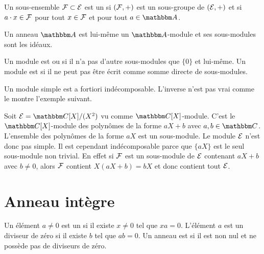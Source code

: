 Un sous-ensemble \( \mathcal{F}\subset\mathcal{E}\) est un  si \( (\mathcal{F},+)\) est un sous-groupe de \( (\mathcal{E},+)\) et si \( a\cdot x\in \mathcal{F}\) pour tout \( x\in \mathcal{F}\) et pour tout \( a\in \eA\).

\begin{example}
    Un anneau \( \eA\) est lui-même un \( \eA\)-module et ses sous-modules sont les idéaux.
\end{example}

Un module est  ou  si il n'a pas d'autre sous-modules que \( \{ 0 \}\) et lui-même. Un module est  si il ne peut pas être écrit comme somme directe de sous-modules.

Un module simple est a fortiori indécomposable. L'inverse n'est pas vrai comme le montre l'exemple suivant.

\begin{example}
    Soit \( \modE=\eC[X]/(X^2)\) vu comme \( \eC[X]\)-module. C'est le \( \eC[X]\)-module des polynômes de la forme \( aX+b\) avec \( a,b\in \eC\). L'ensemble des polynômes de la forme \( aX\) est un sous-module. Le module \( \mathcal{E}\) n'est donc pas simple. Il est cependant indécomposable parce que \( \{ aX \}\) est le seul sous-module non trivial. En effet si \( \mathcal{F}\) est un sous-module de \( \mathcal{E}\) contenant \( aX+b\) avec \( b\neq 0\), alors \( \mathcal{F}\) contient \( X(aX+b)=bX\) et donc contient tout \( \mathcal{E}\).
\end{example}

\section{Anneau intègre}

Un élément \( a\neq 0\) est un  si il existe \( x\neq 0\) tel que $xa=0$. L'élément \( a\) est un diviseur de zéro  si il existe \( b\) tel que \( ab=0\). Un anneau est  si il est non nul et ne possède pas de diviseurs de zéro.

